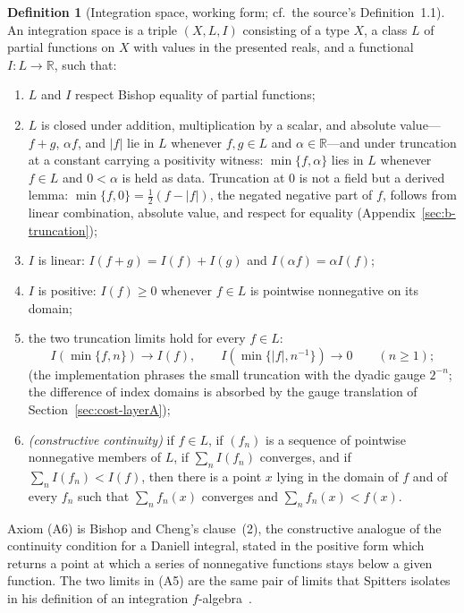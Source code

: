 \documentclass[11pt]{article}
\theoremstyle{definition}
\newtheorem{definition}[theorem]{Definition}
\theoremstyle{remark}
\begin{document}
\begin{definition}[Integration space, working form; cf.\ the source's Definition~1.1]
\label{def:intspace}
An integration space is a triple $(X,L,I)$ consisting of a type $X$, a class $L$ of partial functions on $X$ with values in the presented reals, and a functional $I:L\to\mathbb{R}$, such that:
\begin{enumerate}[label=(A\arabic*)]
\item $L$ and $I$ respect Bishop equality of partial functions;
\item $L$ is closed under addition, multiplication by a scalar, and absolute value---$f+g$, $\alpha f$, and $|f|$ lie in $L$ whenever $f,g\in L$ and $\alpha\in\mathbb{R}$---and under truncation at a constant carrying a positivity witness: $\min\{f,\alpha\}$ lies in $L$ whenever $f\in L$ and $0<\alpha$ is held as data.  Truncation at $0$ is not a field but a derived lemma: $\min\{f,0\}=\tfrac12(f-|f|)$, the negated negative part of $f$, follows from linear combination, absolute value, and respect for equality (Appendix~\ref{sec:b-truncation});
\item $I$ is linear: $I(f+g)=I(f)+I(g)$ and $I(\alpha f)=\alpha I(f)$;
\item $I$ is positive: $I(f)\ge 0$ whenever $f\in L$ is pointwise nonnegative on its domain;
\item the two truncation limits hold for every $f\in L$:
\[
I(\min\{f,n\}) \longrightarrow I(f), \qquad I(\min\{|f|,n^{-1}\}) \longrightarrow 0 \qquad (n\ge1);
\]
(the implementation phrases the small truncation with the dyadic gauge $2^{-n}$; the difference of index domains is absorbed by the gauge translation of Section~\ref{sec:cost-layerA});
\item \emph{(constructive continuity)} if $f\in L$, if $(f_n)$ is a sequence of pointwise nonnegative members of $L$, if $\sum_n I(f_n)$ converges, and if $\sum_n I(f_n)<I(f)$, then there is a point $x$ lying in the domain of $f$ and of every $f_n$ such that $\sum_n f_n(x)$ converges and $\sum_n f_n(x)<f(x)$.
\end{enumerate}
\end{definition}

Axiom (A6) is Bishop and Cheng's clause~(2), the constructive analogue of the continuity condition for a Daniell integral, stated in the positive form which returns a point at which a series of nonnegative functions stays below a given function.  The two limits in (A5) are the same pair of limits that Spitters isolates in his definition of an integration $f$-algebra~\cite{spitters-2006-dagstuhl}.
\end{document}
